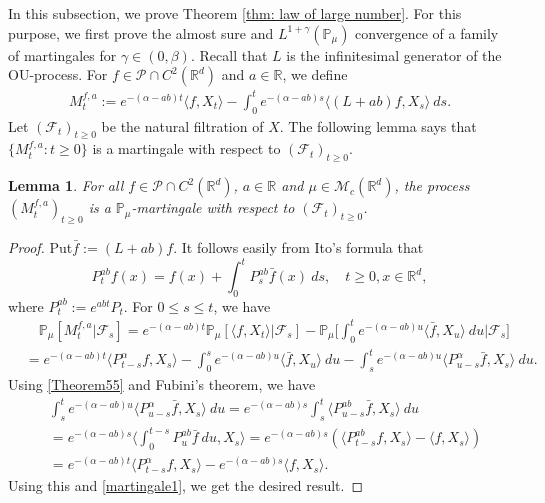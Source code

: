 \documentclass[12pt,a4paper]{amsart}
\theoremstyle{plain}
\newtheorem{lem}[thm]{Lemma}
\theoremstyle{definition}
\numberwithin{equation}{section}
\begin{document}
In this subsection, we prove Theorem \ref{thm: law of large number}.
For this purpose,
we first prove the almost sure and $L^{1+\gamma}(\mathbb{P}_{\mu})$ convergence of a family of martingales for $\gamma\in (0, \beta)$. Recall that $L$ is the infinitesimal generator of the OU-process.  For $f\in \mathcal{P}\cap C^2(\mathbb R^d)$ and  $a\in \mathbb R$, we define
\begin{align}
  \label{defmartingale}
  M_t^{f,a}
  :=e^{-(\alpha-ab)t}\langle f,X_t\rangle-\int_0^t e^{-(\alpha-ab)s}\langle (L+ab)f, X_s\rangle~ ds.
\end{align}
Let $(\mathscr{F}_t)_{t\geq 0}$ be the natural filtration of $X$.  The following lemma says that $\{M_t^{f,a}: t\geq 0\}$ is a martingale with respect to $(\mathscr{F}_t)_{t\geq 0}$.
\begin{lem}
  \label{lemma25}
  For all $f\in \mathcal{P}\cap C^2(\mathbb R^d)$, $a\in \mathbb R$ and $\mu\in \mathcal M_c(\mathbb R^d)$, the process $(M_t^{f,a})_{t\geq 0}$ is a $\mathbb P_\mu$-martingale with respect to $(\mathscr F_t)_{t\geq 0}$.
\end{lem}
\begin{proof}
  Put$\bar{f} :=(L+ab)f$.
  It follows easily from Ito's formula that
\begin{equation}
  \label{Theorem55}
  P_t^{ab}f(x)
  = f(x)+\int_0^t P_s^{ab}\bar{f}(x)~ds,\quad t\geq 0,x\in \mathbb R^d,
\end{equation}
where $P_t^{ab} := e^{abt}P_t$.
For $0\leq s\leq t$, we have
\begin{align}
  \label{martingale1}
  & \quad\mathbb{P}_{\mu}[M_t^{f,a}|\mathscr{F}_s]
    =e^{-(\alpha-ab)t}\mathbb{P}_{\mu}\left[\langle f,X_t\rangle|\mathscr{F}_s\right]-\mathbb{P}_{\mu}\Big[\int_0^t e^{-(\alpha-ab)u}\langle \bar{f}, X_u\rangle~ du\Big|\mathscr{F}_s\big] \\
  & =e^{-(\alpha-ab)t}\langle P_{t-s}^{\alpha}f, X_s\rangle-\int_0^s e^{-(\alpha-ab)u}\langle \bar{f}, X_u\rangle~ du - \int_s^t e^{-(\alpha-ab)u}\langle P_{u-s}^{\alpha} \bar{f},X_s\rangle~ du.
\end{align}
Using \eqref{Theorem55} and Fubini's theorem, we have
\begin{align}
  & \int_s^t e^{-(\alpha-ab)u}\langle P_{u-s}^{\alpha} \bar{f},X_s\rangle~ du=e^{-(\alpha-ab)s}\int_s^t\langle P_{u-s}^{ab}\bar{f},X_s\rangle~du\\
  & = e^{ - ( \alpha - ab ) s } \Big \langle \int_0^{t-s} P_{u}^{ab} \bar{f}~ du, X_s \Big \rangle
    = e^{-(\alpha-ab)s}\left(\langle P_{t-s}^{ab}f,X_s\rangle-\langle
    f, X_s \rangle \right) \\
  & = e^{-(\alpha-ab)t}\langle P_{t-s}^{\alpha}f, X_s\rangle - e^{ - ( \alpha - ab ) s} \langle
    f,X_s\rangle.
\end{align}
Using this and \eqref{martingale1}, we get the desired result.
\end{proof}
\end{document}
